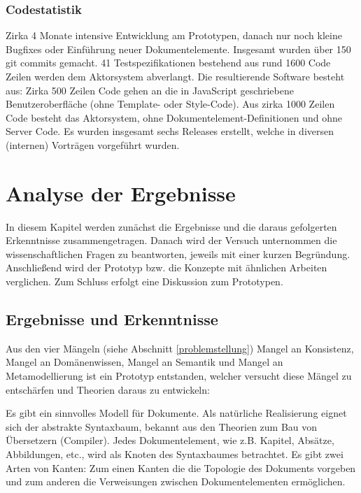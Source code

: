  
\subsection{Codestatistik}\label{}
 
Zirka 4 Monate intensive Entwicklung am Prototypen, danach nur noch kleine Bugfixes oder Einführung neuer Dokumentelemente. Insgesamt wurden über 150 git commits gemacht. 41 Testspezifikationen bestehend aus rund 1600 Code Zeilen werden dem Aktorsystem abverlangt. Die resultierende Software besteht aus: Zirka 500 Zeilen Code gehen an die in JavaScript geschriebene Benutzeroberfläche (ohne Template- oder Style-Code). Aus zirka 1000 Zeilen Code besteht das Aktorsystem, ohne Dokumentelement-Definitionen und ohne Server Code. Es wurden insgesamt sechs Releases erstellt, welche in diversen (internen) Vorträgen vorgeführt wurden.

 
\chapter{Analyse der Ergebnisse}\label{}
 
In diesem Kapitel werden zunächst die Ergebnisse und die daraus gefolgerten Erkenntnisse zusammengetragen. Danach wird der Versuch unternommen die wissenschaftlichen Fragen zu beantworten, jeweils mit einer kurzen Begründung. Anschließend wird der Prototyp bzw. die Konzepte mit ähnlichen Arbeiten verglichen. Zum Schluss erfolgt eine Diskussion zum Prototypen.

 
\section{Ergebnisse und Erkenntnisse}\label{}
 
Aus den vier Mängeln (siehe Abschnitt \ref{problemstellung}) Mangel an Konsistenz, Mangel an Domänenwissen, Mangel an Semantik und Mangel an Metamodellierung ist ein Prototyp entstanden, welcher versucht diese Mängel zu entschärfen und Theorien daraus zu entwickeln:

 
Es gibt ein sinnvolles Modell für Dokumente. Als natürliche Realisierung eignet sich der abstrakte Syntaxbaum, bekannt aus den Theorien zum Bau von Übersetzern (Compiler). Jedes Dokumentelement, wie z.B. Kapitel, Absätze, Abbildungen, etc., wird als Knoten des Syntaxbaumes betrachtet. Es gibt zwei Arten von Kanten: Zum einen Kanten die die Topologie des Dokuments vorgeben und zum anderen die Verweisungen zwischen Dokumentelementen ermöglichen.

